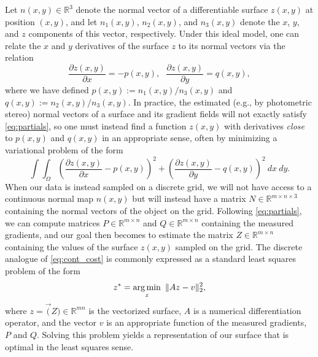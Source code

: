 
Let $n(x,y) \in \mathbb{R}^3$ denote the normal vector of a differentiable surface $z(x,y)$ at position $(x,y)$, and let $n_1(x,y)$, $n_2(x,y)$, and $n_3(x,y)$ denote the $x$, $y$, and $z$ components of this vector, respectively. Under this ideal model, one can relate the $x$ and $y$ derivatives of the surface $z$ to its normal vectors via the relation
\begin{equation} \label{eq:partials}
\frac{\partial z(x,y)}{\partial x} = -p(x,y), \ \ \ \frac{\partial z(x,y)}{\partial y} = q(x,y),
\end{equation}
where we have defined $p(x,y) := n_1(x,y)/n_3(x,y)$ and $q(x,y) := n_2(x,y)/n_3(x,y)$. In practice, the estimated (e.g., by photometric stereo) normal vectors of a surface and its gradient fields will not exactly satisfy \eqref{eq:partials}, so one must instead find a function $z(x,y)$ with derivatives \emph{close} to $p(x,y)$ and $q(x,y)$ in an appropriate sense, often by minimizing a variational problem of the form
\begin{equation} \label{eq:cont_cost}
\int \int_{\Omega} \left (\frac{\partial z(x,y)}{\partial x}  - p(x,y) \right )^2 + \left ( \frac{\partial z(x,y)}{\partial y} - q(x,y) \right )^2 \ dx \ dy.
\end{equation}
When our data is instead sampled on a discrete grid, we will not have access to a continuous normal map $n(x,y)$ but will instead have a matrix $N \in \mathbb{R}^{m \times n \times 3}$ containing the normal vectors of the object on the grid. Following \eqref{eq:partials}, we can compute matrices $P \in \mathbb{R}^{m \times n}$ and $Q \in \mathbb{R}^{m \times n}$ containing the measured gradients, and our goal then becomes to estimate the matrix $Z \in \mathbb{R}^{m \times n}$ containing the values of the surface $z(x,y)$ sampled on the grid. The discrete analogue of \eqref{eq:cont_cost} is commonly expressed \cite{simchony1990,frankot1988,harker2008} as a standard least squares problem of the form
\begin{equation} \label{eq:surf_ls}
z^* = \operatorname*{arg\,min}_{z} \ \|A z - v \|_2^2,
\end{equation}
where $z = \vec(Z) \in \mathbb{R}^{mn}$ is the vectorized surface, $A$ is a numerical differentiation operator, and the vector $v$ is an appropriate function of the measured gradients, $P$ and $Q$. Solving this problem yields a representation of our surface that is optimal in the least squares sense.

